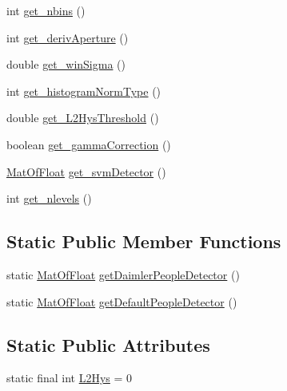 \begin{DoxyCompactItemize}
\item 
int \mbox{\hyperlink{classorg_1_1opencv_1_1objdetect_1_1_h_o_g_descriptor_ac4c27c9e6d4802d97eaedec8ed571d93}{get\+\_\+nbins}} ()
\item 
int \mbox{\hyperlink{classorg_1_1opencv_1_1objdetect_1_1_h_o_g_descriptor_a96f819a4fab412673689e3c2ff49916c}{get\+\_\+deriv\+Aperture}} ()
\item 
double \mbox{\hyperlink{classorg_1_1opencv_1_1objdetect_1_1_h_o_g_descriptor_ad776e2401540e8888b86890688d4fc98}{get\+\_\+win\+Sigma}} ()
\item 
int \mbox{\hyperlink{classorg_1_1opencv_1_1objdetect_1_1_h_o_g_descriptor_aee1c2fc4f602738f37c4ca42daf6f8c9}{get\+\_\+histogram\+Norm\+Type}} ()
\item 
double \mbox{\hyperlink{classorg_1_1opencv_1_1objdetect_1_1_h_o_g_descriptor_a6ed247bb4cf037ed05445157f32f59d4}{get\+\_\+\+L2\+Hys\+Threshold}} ()
\item 
boolean \mbox{\hyperlink{classorg_1_1opencv_1_1objdetect_1_1_h_o_g_descriptor_a27b04d715c5d40c35e3ae52dc19c291b}{get\+\_\+gamma\+Correction}} ()
\item 
\mbox{\hyperlink{classorg_1_1opencv_1_1core_1_1_mat_of_float}{Mat\+Of\+Float}} \mbox{\hyperlink{classorg_1_1opencv_1_1objdetect_1_1_h_o_g_descriptor_a939852045ed6582fcfaa0202d02bf422}{get\+\_\+svm\+Detector}} ()
\item 
int \mbox{\hyperlink{classorg_1_1opencv_1_1objdetect_1_1_h_o_g_descriptor_add9b44c854e529778648f73042d44745}{get\+\_\+nlevels}} ()
\end{DoxyCompactItemize}
\subsection*{Static Public Member Functions}
\begin{DoxyCompactItemize}
\item 
static \mbox{\hyperlink{classorg_1_1opencv_1_1core_1_1_mat_of_float}{Mat\+Of\+Float}} \mbox{\hyperlink{classorg_1_1opencv_1_1objdetect_1_1_h_o_g_descriptor_a45f8ce21b9774da665b2398bfa87dfb7}{get\+Daimler\+People\+Detector}} ()
\item 
static \mbox{\hyperlink{classorg_1_1opencv_1_1core_1_1_mat_of_float}{Mat\+Of\+Float}} \mbox{\hyperlink{classorg_1_1opencv_1_1objdetect_1_1_h_o_g_descriptor_a2d2aabe51da0f247c0276dc1f0faa770}{get\+Default\+People\+Detector}} ()
\end{DoxyCompactItemize}
\subsection*{Static Public Attributes}
\begin{DoxyCompactItemize}
\item 
static final int \mbox{\hyperlink{classorg_1_1opencv_1_1objdetect_1_1_h_o_g_descriptor_acd4afb5abe08c9adfd04cb9e918a3891}{L2\+Hys}} = 0
\end{DoxyCompactItemize}
